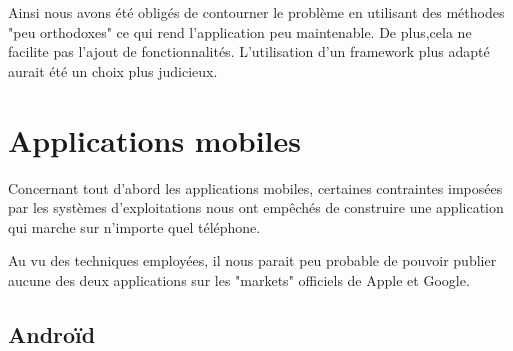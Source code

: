 Ainsi nous avons été obligés de contourner le problème en utilisant des méthodes "peu orthodoxes" ce qui rend l'application peu maintenable.
De plus,cela ne facilite pas l'ajout de fonctionnalités.
L'utilisation d'un framework plus adapté aurait été un choix plus judicieux.






\section{Applications mobiles}

Concernant tout d'abord les applications mobiles, certaines contraintes imposées par les systèmes d'exploitations nous ont empêchés de construire une application qui marche sur n'importe quel téléphone.

Au vu des techniques employées, il nous parait peu probable de pouvoir publier aucune des
deux applications sur les "markets" officiels de Apple et Google.




\subsection{Androïd}



